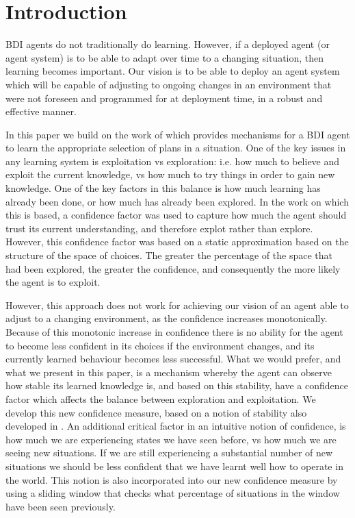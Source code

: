 \section{Introduction}\label{sec:introduction}

BDI agents do not traditionally do learning. However, if a deployed agent
(or agent system) is to be able to adapt over time to a changing
situation, then learning becomes important. Our vision is to be able
to deploy an agent system which will be capable of adjusting to
ongoing changes in an environment that were not foreseen and
programmed for at deployment time, in a robust and effective manner.

In this paper we build on the work of \cite{} which provides
mechanisms for a BDI agent to learn the appropriate selection of plans
in a situation. One of the key issues in any learning system is
exploitation vs exploration: i.e. how much to believe and exploit the
current knowledge, vs how much to try things in order to gain new
knowledge. One of the key factors in this balance is how much learning
has already been done, or how much has already been explored. In the
work on which this is based, a confidence factor was used to capture
how much the agent should trust its current understanding, and
therefore explot rather than explore. However, this confidence factor
was based on a static approximation based on the structure of the
space of choices. The greater the percentage of the space that had
been explored, the greater the confidence, and consequently the more
likely the agent is to exploit.  

However, this approach does not work for achieving our vision of an
agent able to adjust to a changing environment, as the confidence
increases monotonically. Because of this monotonic increase in
confidence there is no ability for the agent
to become less confident in its choices if the environment changes,
and its currently learned behaviour becomes less successful.
What we would prefer, and what we present in this paper, is a
mechanism whereby the agent can observe how stable its learned
knowledge is, and based on this stability, have a confidence factor
which affects the balance between exploration and exploitation. We
develop this new confidence measure, based on a notion of stability
also developed in \cite{}.  An additional critical factor in an
intuitive notion of confidence, is how much we are experiencing states
we have seen before, vs how much we are seeing new situations. If we
are still experiencing a substantial number of new situations we
should be less confident that we have learnt well how to operate in
the world. This notion is also incorporated into our new confidence
measure by using a sliding window that checks what percentage of
situations in the window have been seen previously.

